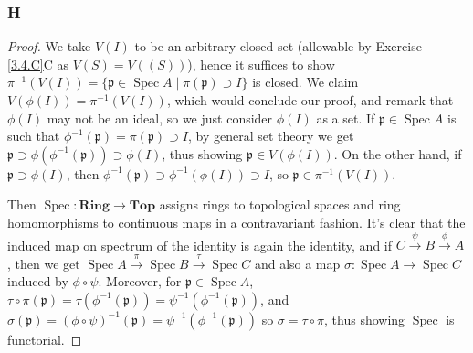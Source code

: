 \documentclass{article}
\newcommand{\frkp}{\mathfrak{p}}
\newcommand{\Ring}{\mathbf{Ring}} %
\newcommand{\Top}{\mathbf{Top}} %
\DeclareMathOperator{\Spec}{\mathrm{Spec}}
\theoremstyle{definition} %
\begin{document}
\subsubsection{H}\label{3.4.H}
\begin{proof}
    We take $V(I)$ to be an arbitrary closed set (allowable by Exercise \ref{3.4.C}C as $V(S)=V((S))$), hence it suffices to show $\pi^{-1}(V(I))=\{\frkp \in \Spec A \mid \pi(\frkp)\supset I\}$ is closed. We claim $V(\phi(I))= \pi^{-1}(V(I))$, which would conclude our proof, and remark that $\phi(I)$ may not be an ideal, so we just consider $\phi(I)$ as a set. If $\frkp \in \Spec A$ is such that $\phi^{-1}(\frkp)=\pi(\frkp)\supset I$, by general set theory we get $\frkp \supset \phi(\phi^{-1}(\frkp))\supset \phi(I)$, thus showing $\frkp \in V(\phi(I))$. On the other hand, if $\frkp \supset \phi(I)$, then $\phi^{-1}(\frkp)\supset \phi^{-1}(\phi(I))\supset I$, so $\frkp \in \pi^{-1}(V(I))$.

    Then $\Spec:\Ring \to \Top$ assigns rings to topological spaces and ring homomorphisms to continuous maps in a contravariant fashion. It's clear that the induced map on spectrum of the identity is again the identity, and if $C\xrightarrow{\psi} B \xrightarrow{\phi} A$, then we get $\Spec A \xrightarrow{\pi} \Spec B \xrightarrow{\tau} \Spec C$ and also a map $\sigma:\Spec A \to \Spec C$ induced by $\phi \circ \psi$. Moreover, for $\frkp \in \Spec A$, $\tau \circ \pi(\frkp)=\tau(\phi^{-1}(\frkp))=\psi^{-1}(\phi^{-1}(\frkp))$, and $\sigma(\frkp)=(\phi \circ \psi)^{-1}(\frkp)=\psi^{-1}(\phi^{-1}(\frkp))$ so $\sigma = \tau \circ \pi$, thus showing $\Spec$ is functorial.
\end{proof}
\end{document}
